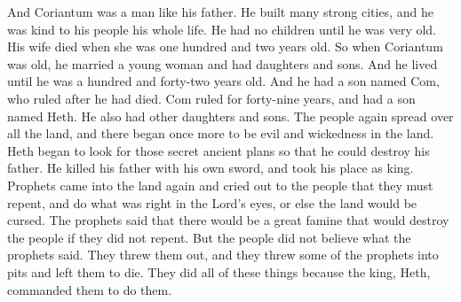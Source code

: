 And Coriantum was a man like his father. He built many strong cities, and he was kind to his people his whole life. He had no children until he was very old.
\bverse \iffalse And it came to pass that his wife died, being an hundred and two years old. And it came to pass that Coriantum took to wife, in his old age, a young maid, and begat sons and daughters; wherefore he lived until he was an hundred and forty and two years old. \fi
His wife died when she was one hundred and two years old. So when Coriantum was old, he married a young woman and had daughters and sons. And he lived until he was a hundred and forty-two years old.
\bverse \iffalse And it came to pass that he begat Com, and Com reigned in his stead; and he reigned forty and nine years, and he begat Heth; and he also begat other sons and daughters. \fi
And he had a son named Com, who ruled after he had died. Com ruled for forty-nine years, and had a son named Heth. He also had other daughters and sons.
\bverse \iffalse And the people had spread again over all the face of the land, and there began again to be an exceedingly great wickedness upon the face of the land, and Heth began to embrace the secret plans again of old, to destroy his father. \fi
The people again spread over all the land, and there began once more to be evil and wickedness in the land. Heth began to look for those secret ancient plans so that he could destroy his father.
\bverse \iffalse And it came to pass that he did dethrone his father, for he slew him with his own sword; and he did reign in his stead. \fi
He killed his father with his own sword, and took his place as king.
\bverse \iffalse And there came prophets in the land again, crying repentance unto them--that they must prepare the way of the Lord or there should come a curse upon the face of the land; yea, even there should be a great famine, in which they should be destroyed if they did not repent. \fi
Prophets came into the land again and cried out to the people that they must repent, and do what was right in the Lord's eyes, or else the land would be cursed. The prophets said that there would be a great famine that would destroy the people if they did not repent.
\bverse \iffalse But the people believed not the words of the prophets, but they cast them out; and some of them they cast into pits and left them to perish. And it came to pass that they did all these things according to the commandment of the king, Heth. \fi
But the people did not believe what the prophets said. They threw them out, and they threw some of the prophets into pits and left them to die. They did all of these things because the king, Heth, commanded them to do them.
